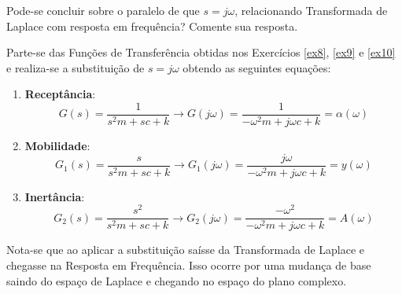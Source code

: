 \documentclass{article}
\begin{document}
\newpage
\begin{exercise}\label{ex13}
    Pode-se concluir sobre o paralelo de que $s = j\omega$, relacionando Transformada de Laplace com resposta em frequência? Comente sua resposta.
\end{exercise}
\begin{resolution}
    Parte-se das Funções de Transferência obtidas nos Exercícios \ref{ex8}, \ref{ex9} e \ref{ex10} e realiza-se a substituição de $s = j\omega$ obtendo as seguintes equações:
    \begin{enumerate}
        \item \textbf{Receptância}:
        \begin{equation}
            G(s) = \frac{1}{s^2m + sc + k} \to \boxed{G(j\omega) = \frac{1}{-\omega^2m + j\omega c + k} = \alpha(\omega)}
        \end{equation}

        \item \textbf{Mobilidade}:
        \begin{equation}
            G_1(s) = \frac{s}{s^2m + sc + k} \to \boxed{G_1(j\omega) = \frac{j\omega}{-\omega^2m + j\omega c + k} = y(\omega)}
        \end{equation}

        \item \textbf{Inertância}:
        \begin{equation}
            G_2(s) = \frac{s^2}{s^2m + sc + k} \to \boxed{G_2(j\omega) = \frac{-\omega^2}{-\omega^2m + j\omega c + k} = A(\omega)}
        \end{equation}
    \end{enumerate}
    Nota-se que ao aplicar a substituição saísse da Transformada de Laplace e chegasse na Resposta em Frequência. Isso ocorre por uma mudança de base saindo do espaço de Laplace e chegando no espaço do plano complexo.
\end{resolution}
\end{document}
